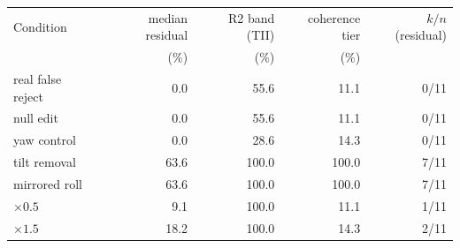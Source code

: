 \footnotesize
\begin{tabular}{lrrrr}
\toprule
Condition & median residual & R2 band (TII) & coherence tier & $k/n$ (residual) \\
 & (\%) & (\%) & (\%) & \\
\midrule
real false reject & 0.0 & 55.6 & 11.1 & 0/11 \\
null edit & 0.0 & 55.6 & 11.1 & 0/11 \\
yaw control & 0.0 & 28.6 & 14.3 & 0/11 \\
tilt removal & 63.6 & 100.0 & 100.0 & 7/11 \\
mirrored roll & 63.6 & 100.0 & 100.0 & 7/11 \\
$\times 0.5$ & 9.1 & 100.0 & 11.1 & 1/11 \\
$\times 1.5$ & 18.2 & 100.0 & 14.3 & 2/11 \\
\bottomrule
\end{tabular}
